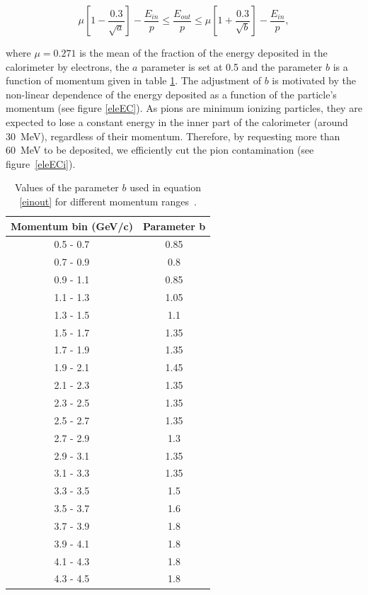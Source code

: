 \begin{equation}
\label{einout}
\mu  \left[1-\frac{0.3}{\sqrt{a}}\right] - \frac{E_{in}}{p} \leq 
\frac{E_{out}}{p} \leq 
\mu  \left[1+\frac{0.3}{\sqrt{b}}\right] - \frac{E_{in}}{p},
\end{equation}

where $\mu = 0.271$ is the mean of the fraction of the energy deposited in the 
calorimeter by electrons, the $a$ parameter is set at 0.5 and the parameter 
$b$ is a function of momentum given in table \ref{tab:ecoutin-par}. The 
adjustment of $b$ is motivated by the non-linear dependence of the energy 
deposited as a function of the particle's momentum (see figure \ref{eleEC}). As pions are 
minimum ionizing particles, they are expected to lose a constant energy in 
the inner part of the calorimeter (around 30~MeV), regardless of their 
momentum. Therefore, by requesting more than 60~MeV to be deposited, we 
efficiently cut the pion contamination (see figure~\ref{eleECi}).

\begin{table}[tbp]
  \centering
  \begin{tabular}{@{} cc @{}}
    \hline
    Momentum bin (GeV/c)& Parameter b \\ 
    \hline
    0.5 - 0.7 & 0.85 \\
    0.7 - 0.9 & 0.8  \\
    0.9 - 1.1 & 0.85 \\
    1.1 - 1.3 & 1.05 \\
    1.3 - 1.5 & 1.1  \\
    1.5 - 1.7 & 1.35 \\
    1.7 - 1.9 & 1.35 \\
    1.9 - 2.1 & 1.45 \\
    2.1 - 2.3 & 1.35 \\
    2.3 - 2.5 & 1.35 \\
    2.5 - 2.7 & 1.35 \\
    2.7 - 2.9 & 1.3  \\
    2.9 - 3.1 & 1.35 \\
    3.1 - 3.3 & 1.35 \\
    3.3 - 3.5 & 1.5  \\
    3.5 - 3.7 & 1.6  \\
    3.7 - 3.9 & 1.8  \\
    3.9 - 4.1 & 1.8  \\
    4.1 - 4.3 & 1.8  \\
    4.3 - 4.5 & 1.8  \\
    \hline
  \end{tabular}
  \caption{Values of the parameter $b$ used in equation \ref{einout} for 
           different momentum ranges~\cite{ElFassi:2008}.}
  \label{tab:ecoutin-par}
\end{table}

